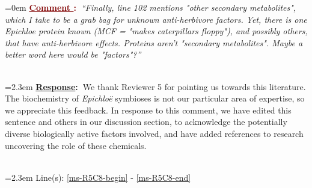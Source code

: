 \documentclass[12pt]{article}
\newcounter{cN}
\newcommand{\comment}[1]{
	\vspace{2em}
	\refstepcounter{cN} %
	\noindent \hangindent=0em \textbf{\textcolor{Maroon}{\uline{Comment \thecN}:~}}\emph{``#1''}
	}
\newcommand{\response}[1]{
	\\[0.25em]
	\hangindent=2.3em \textbf{\textcolor{NavyBlue}{\uline{Response}:~}}#1
	}
\newcommand{\linesref}[2]{
		\\[0.25em]
	\hangindent=2.3em {\color{Mahogany} Line(s): \ref{#1} - \ref{#2}}
}
\begin{document}
\comment{Finally, line 102 mentions "other secondary metabolites", which I take to be a grab bag for unknown anti-herbivore factors. Yet, there is one Epichloe protein known (MCF = "makes caterpillars floppy"), and possibly others, that have anti-herbivore effects. Proteins aren't "secondary metabolites". Maybe a better word here would be "factors"?}
\response{We thank Reviewer 5 for pointing us towards this literature. The biochemistry of \emph{Epichloë} symbioses is not our particular area of expertise, so we appreciate this feedback. In response to this comment, we have edited this sentence and others in our discussion section, to acknowledge the potentially diverse biologically active factors involved, and have added references to research uncovering the role of these chemicals.}
\linesref{ms-R5C8-begin}{ms-R5C8-end}











\end{document}
